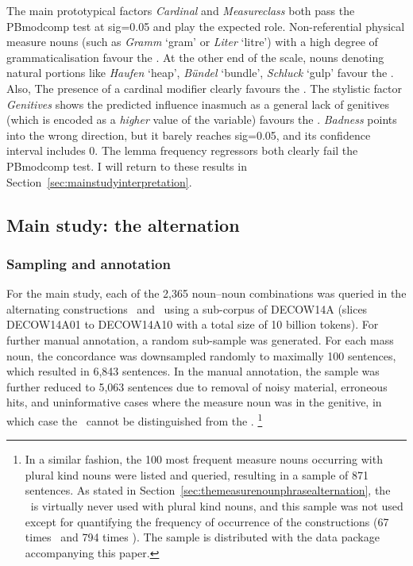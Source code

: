 The main prototypical factors \textit{Cardinal} and \textit{Measureclass} both pass the PBmodcomp test at sig=0.05 and play the expected role.
Non-referential physical measure nouns (such as \textit{Gramm} `gram' or \textit{Liter} `litre') with a high degree of grammaticalisation favour the \NACb.
At the other end of the scale, nouns denoting natural portions like \textit{Haufen} `heap', \textit{Bündel} `bundle', \textit{Schluck} `gulp' favour the \PGCd.
Also, The presence of a cardinal modifier clearly favours the \NACb.
The stylistic factor \textit{Genitives} shows the predicted influence inasmuch as a general lack of genitives (which is encoded as a \textit{higher} value of the variable) favours the \NACb.
\textit{Badness} points into the wrong direction, but it barely reaches sig=0.05, and its confidence interval includes 0.
The lemma frequency regressors both clearly fail the PBmodcomp test.
I will return to these results in Section~\ref{sec:mainstudyinterpretation}.

\subsection{Main study: the alternation}
\label{sec:annotation}
\label{sec:corpushierarchicalmodel}

\subsubsection{Sampling and annotation}
\label{sec:mainstudysampling}

For the main study, each of the 2,365 noun–noun combinations was queried in the alternating constructions \PGCa\ and \NACa\ using a sub-corpus of DECOW14A (slices DECOW14A01 to DECOW14A10 with a total size of 10 billion tokens).
For further manual annotation, a random sub-sample was generated.
For each mass noun, the concordance was downsampled randomly to maximally 100 sentences, which resulted in 6,843 sentences.
In the manual annotation, the sample was further reduced to 5,063 sentences due to removal of noisy material, erroneous hits, and uninformative cases where the measure noun was in the genitive, in which case the \NACa\ cannot be distinguished from the \PGCa.%
\footnote{In a similar fashion, the 100 most frequent measure nouns occurring with plural kind nouns were listed and queried, resulting in a sample of 871 sentences.
As stated in Section~\ref{sec:themeasurenounphrasealternation}, the \NACa\ is virtually never used with plural kind nouns, and this sample was not used except for quantifying the frequency of occurrence of the constructions (67 times \NACa\ and 794 times \PGCa).
The sample is distributed with the data package accompanying this paper.}

